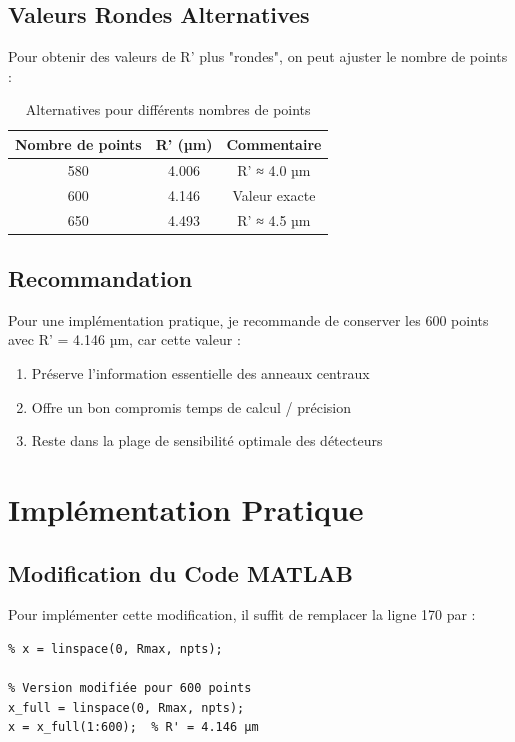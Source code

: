 \documentclass[twocolumn,10pt]{article}
\begin{document}
\subsection{Valeurs Rondes Alternatives}

Pour obtenir des valeurs de R' plus "rondes", on peut ajuster le nombre de points :

\begin{table}[H]
\centering
\caption{Alternatives pour différents nombres de points}
\begin{tabular}{|c|c|c|}
\hline
\textbf{Nombre de points} & \textbf{R' (µm)} & \textbf{Commentaire} \\
\hline
580 & 4.006 & R' ≈ 4.0 µm \\
600 & 4.146 & Valeur exacte \\
650 & 4.493 & R' ≈ 4.5 µm \\
\hline
\end{tabular}
\end{table}

\subsection{Recommandation}

Pour une implémentation pratique, je recommande de conserver les 600 points avec R' = 4.146 µm, car cette valeur :

\begin{enumerate}
\item Préserve l'information essentielle des anneaux centraux
\item Offre un bon compromis temps de calcul / précision
\item Reste dans la plage de sensibilité optimale des détecteurs
\end{enumerate}

\section{Implémentation Pratique}

\subsection{Modification du Code MATLAB}

Pour implémenter cette modification, il suffit de remplacer la ligne 170 par :

\begin{lstlisting}[style=matlab, caption=Modification proposée du code]
% Version originale (ligne 170)
% x = linspace(0, Rmax, npts);

% Version modifiée pour 600 points
x_full = linspace(0, Rmax, npts);
x = x_full(1:600);  % R' = 4.146 µm
\end{lstlisting}
\end{document}
